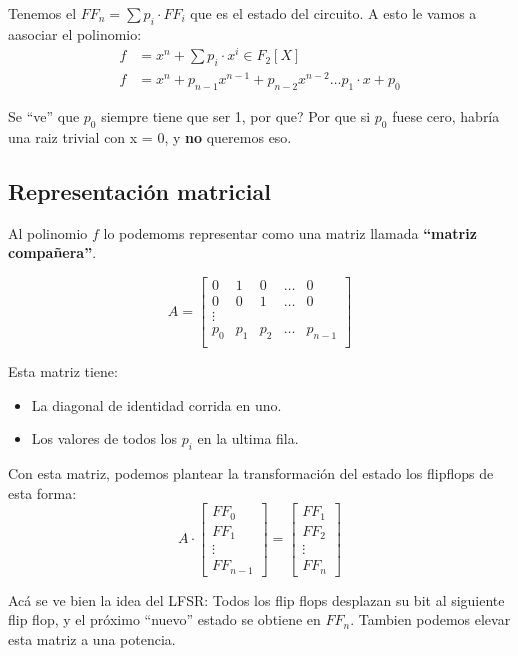 \documentclass[12pt,a4paper]{report}
\begin{document}
Tenemos el $FF_n = \sum p_i \cdot FF_i$ que es el estado del circuito. A esto le vamos a aasociar el polinomio:
\begin{align*}
f &= x^n + \sum p_i \cdot x^i \in F_2[X] \\
f &= x^n + p_{n-1} x^{n-1} + p_{n-2} x^{n-2} \dots p_1 \cdot x + p_0
\end{align*}

Se ``ve'' que $p_0$ siempre tiene que ser 1, por que? Por que si $p_0$ fuese cero, habría una raiz trivial con x = 0, y \textbf{no} queremos eso.

\subsection{Representación matricial}
Al polinomio $f$ lo podemoms representar como una matriz llamada \textbf{``matriz compañera''}.

$$
A = \begin{bmatrix}
  0 & 1 & 0 & \dots & 0 \\
  0 & 0 & 1 & \dots & 0 \\
  \vdots \\
  p_0 & p_1 & p_2 & \dots & p_{n-1} \\
    \end{bmatrix}
$$

Esta matriz tiene:

\begin{itemize}
\item{La diagonal de identidad corrida en uno.}
\item{Los valores de todos los $p_i$ en la ultima fila.}
\end{itemize}

Con esta matriz, podemos plantear la transformación del estado los flipflops de esta forma:
$$
A \cdot \begin{bmatrix} FF_0 \\ FF_1 \\ \vdots \\ FF_{n-1} \end{bmatrix} = \begin{bmatrix} FF_1 \\ FF_2 \\ \vdots \\ FF_{n} \end{bmatrix}
$$

Acá se ve bien la idea del LFSR: Todos los flip flops desplazan su bit al siguiente flip flop, y el próximo ``nuevo'' estado se obtiene en $FF_n$. Tambien podemos elevar esta matriz a una potencia.
\end{document}
